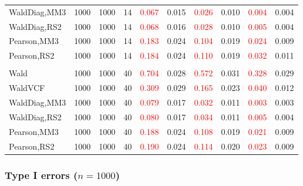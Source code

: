 \documentclass[
]{article}
\begin{document}
\begin{table}[H]
{\begin{tabular}[t]{lrrrrrrlrr}
\hspace{1em}WaldDiag,MM3 & 1000 & 1000 & 14 & \textcolor{red}{0.067} & 0.015 & \textcolor{red}{0.026} & 0.010 & \textcolor{red}{0.004} & 0.004\\
\hspace{1em}WaldDiag,RS2 & 1000 & 1000 & 14 & \textcolor{red}{0.068} & 0.016 & \textcolor{red}{0.028} & 0.010 & \textcolor{red}{0.005} & 0.004\\
\hspace{1em}Pearson,MM3 & 1000 & 1000 & 14 & \textcolor{red}{0.183} & 0.024 & \textcolor{red}{0.104} & 0.019 & \textcolor{red}{0.024} & 0.009\\
\hspace{1em}Pearson,RS2 & 1000 & 1000 & 14 & \textcolor{red}{0.184} & 0.024 & \textcolor{red}{0.110} & 0.019 & \textcolor{red}{0.032} & 0.011\\
\addlinespace[0.3em]
\multicolumn{10}{l}{\textbf{3F 15V}}\\
\hspace{1em}Wald & 1000 & 1000 & 40 & \textcolor{red}{0.704} & 0.028 & \textcolor{red}{0.572} & 0.031 & \textcolor{red}{0.328} & 0.029\\
\hspace{1em}WaldVCF & 1000 & 1000 & 40 & \textcolor{red}{0.309} & 0.029 & \textcolor{red}{0.165} & 0.023 & \textcolor{red}{0.040} & 0.012\\
\hspace{1em}WaldDiag,MM3 & 1000 & 1000 & 40 & \textcolor{red}{0.079} & 0.017 & \textcolor{red}{0.032} & 0.011 & \textcolor{red}{0.003} & 0.003\\
\hspace{1em}WaldDiag,RS2 & 1000 & 1000 & 40 & \textcolor{red}{0.080} & 0.017 & \textcolor{red}{0.034} & 0.011 & \textcolor{red}{0.005} & 0.004\\
\hspace{1em}Pearson,MM3 & 1000 & 1000 & 40 & \textcolor{red}{0.188} & 0.024 & \textcolor{red}{0.108} & 0.019 & \textcolor{red}{0.021} & 0.009\\
\hspace{1em}Pearson,RS2 & 1000 & 1000 & 40 & \textcolor{red}{0.190} & 0.024 & \textcolor{red}{0.114} & 0.020 & \textcolor{red}{0.023} & 0.009\\
\bottomrule
\end{tabular}}
\endgroup{}
\end{table}

\hypertarget{type-i-errors-n1000-1}{%
\subsubsection{\texorpdfstring{Type I errors
(\(n=1000\))}{Type I errors (n=1000)}}\label{type-i-errors-n1000-1}}
\end{document}
